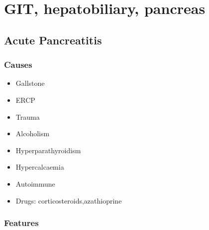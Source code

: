 \documentclass[
  14pt,
]{memoir}
\providecommand{\tightlist}{%
  \setlength{\itemsep}{0pt}\setlength{\parskip}{0pt}}
\begin{document}
\pagebreak

\hypertarget{git-hepatobiliary-pancreas}{%
\chapter{GIT, hepatobiliary,
pancreas}\label{git-hepatobiliary-pancreas}}

\hypertarget{acute-pancreatitis}{%
\section{Acute Pancreatitis}\label{acute-pancreatitis}}

\hypertarget{causes-1}{%
\subsection{Causes}\label{causes-1}}

\begin{itemize}
\tightlist
\item
  Gallstone
\item
  ERCP
\item
  Trauma
\item
  Alcoholism
\item
  Hyperparathyroidism
\item
  Hypercalcaemia
\item
  Autoimmune
\item
  Drugs: corticosteroids,azathioprine
\end{itemize}

\hypertarget{features-10}{%
\subsection{Features}\label{features-10}}
\end{document}
